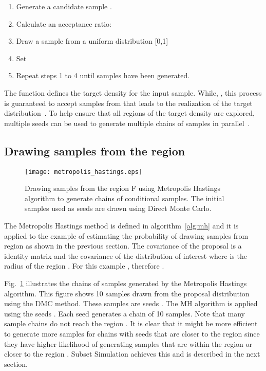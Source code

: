 \documentclass[journal]{IEEEtran}
\begin{document}
\begin{enumerate}
  \item Generate a candidate sample .
  \item Calculate an acceptance ratio:  
	\item Draw a sample  from a uniform distribution [0,1]	
  \item Set 
						
	\item Repeat steps 1 to 4 until  samples have been generated.
\end{enumerate}

\noindent The function  defines the target density for the input sample. While, , this process is guaranteed to accept samples from  that leads to the realization of the target distribution~\cite{robert2004metropolis}. To help ensure that all regions of the target density are explored, multiple seeds can be used to generate multiple chains of samples in parallel~\cite{IVAN}.

\subsection{Drawing samples from the region }

\begin{figure}[h]\centering
	\texttt{[image: metropolis\_hastings.eps]}
\caption{Drawing samples from the region F using Metropolis Hastings algorithm to generate chains of conditional samples. The initial samples used as seeds are drawn using Direct Monte Carlo.}
	\label{fig:mh}
\end{figure}

The Metropolis Hastings method is defined in algorithm~\ref{alg:mh} and it is applied to the example of estimating the probability of drawing samples from region  as shown in the previous section. The covariance of the proposal  is a  identity matrix  and the covariance of the distribution of interest  where  is the radius of the region . For this example , therefore .

Fig.~\ref{fig:mh} illustrates the chains of samples generated by the Metropolis Hastings algorithm. This figure shows 10 samples drawn from the proposal distribution using the DMC method. These samples are seeds . The MH algorithm is applied using the seeds . Each seed generates a chain of 10 samples. Note that many sample chains do not reach the region . It is clear that it might be more efficient to generate more samples for chains with seeds that are closer to the region  since they have higher likelihood of generating samples that are within the region  or closer to the region . Subset Simulation achieves this and is described in the next section.
\end{document}
